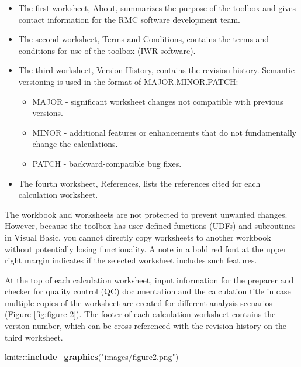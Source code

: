 \documentclass[
]{book}
\newenvironment{Shaded}{\begin{snugshade}}{\end{snugshade}}
\newcommand{\FunctionTok}[1]{\textcolor[rgb]{0.13,0.29,0.53}{\textbf{#1}}}
\newcommand{\NormalTok}[1]{#1}
\newcommand{\SpecialCharTok}[1]{\textcolor[rgb]{0.81,0.36,0.00}{\textbf{#1}}}
\newcommand{\StringTok}[1]{\textcolor[rgb]{0.31,0.60,0.02}{#1}}
\begin{document}
\begin{itemize}
\item
  The first worksheet, About, summarizes the purpose of the toolbox and gives contact information for the RMC software development team.
\item
  The second worksheet, Terms and Conditions, contains the terms and conditions for use of the toolbox (IWR software).
\item
  The third worksheet, Version History, contains the revision history. Semantic versioning is used in the format of MAJOR.MINOR.PATCH:

  \begin{itemize}
  \item
    MAJOR - significant worksheet changes not compatible with previous versions.
  \item
    MINOR - additional features or enhancements that do not fundamentally change the calculations.
  \item
    PATCH - backward-compatible bug fixes.
  \end{itemize}
\item
  The fourth worksheet, References, lists the references cited for each calculation worksheet.
\end{itemize}

The workbook and worksheets are not protected to prevent unwanted changes. However, because the toolbox has user-defined functions (UDFs) and subroutines in Visual Basic, you cannot directly copy worksheets to another workbook without potentially losing functionality. A note in a bold red font at the upper right margin indicates if the selected worksheet includes such features.

At the top of each calculation worksheet, input information for the preparer and checker for quality control (QC) documentation and the calculation title in case multiple copies of the worksheet are created for different analysis scenarios (Figure \ref{fig:figure-2}). The footer of each calculation worksheet contains the version number, which can be cross-referenced with the revision history on the third worksheet.

\begin{Shaded}
\begin{Highlighting}[]
\NormalTok{knitr}\SpecialCharTok{::}\FunctionTok{include\_graphics}\NormalTok{(}\StringTok{"images/figure2.png"}\NormalTok{)}
\end{Highlighting}
\end{Shaded}
\end{document}
